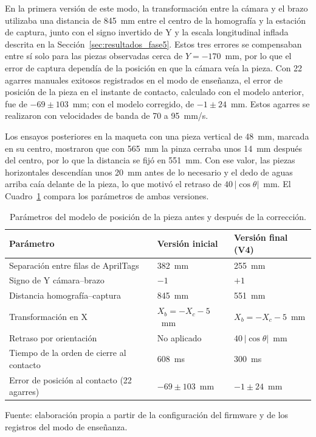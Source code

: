 En la primera versión de este modo, la transformación entre la cámara y el brazo utilizaba una distancia de 845~mm entre el centro de la homografía y la estación de captura, junto con el signo invertido de Y y la escala longitudinal inflada descrita en la Sección~\ref{sec:resultados_fase5}. Estos tres errores se compensaban entre sí solo para las piezas observadas cerca de $Y=-170$~mm, por lo que el error de captura dependía de la posición en que la cámara veía la pieza. Con 22 agarres manuales exitosos registrados en el modo de enseñanza, el error de posición de la pieza en el instante de contacto, calculado con el modelo anterior, fue de $-69\pm103$~mm; con el modelo corregido, de $-1\pm24$~mm. Estos agarres se realizaron con velocidades de banda de 70 a 95~mm/s.

Los ensayos posteriores en la maqueta con una pieza vertical de 48~mm, marcada en su centro, mostraron que con 565~mm la pinza cerraba unos 14~mm después del centro, por lo que la distancia se fijó en 551~mm. Con ese valor, las piezas horizontales descendían unos 20~mm antes de lo necesario y el dedo de aguas arriba caía delante de la pieza, lo que motivó el retraso de $40\,\lvert\cos\theta\rvert$~mm. El Cuadro~\ref{tab:fase5_modelo_posicion} compara los parámetros de ambas versiones.

\begin{table}[H]
    \centering
    \caption{Parámetros del modelo de posición de la pieza antes y después de la corrección.}
    \label{tab:fase5_modelo_posicion}
    \begin{tabular}{p{}p{}p{}}
        \hline
        Parámetro & Versión inicial & Versión final (V4) \\
        \hline
        Separación entre filas de AprilTags & 382~mm & 255~mm \\
        Signo de Y cámara--brazo & $-1$ & $+1$ \\
        Distancia homografía--captura & 845~mm & 551~mm \\
        Transformación en X & $X_b=-X_c-5$~mm & $X_b=-X_c-5$~mm \\
        Retraso por orientación & No aplicado & $40\,\lvert\cos\theta\rvert$~mm \\
        Tiempo de la orden de cierre al contacto & 608~ms & 300~ms \\
        Error de posición al contacto (22 agarres) & $-69\pm103$~mm & $-1\pm24$~mm \\
        \hline
    \end{tabular}
    \par\small\raggedright Fuente: elaboración propia a partir de la configuración del firmware y de los registros del modo de enseñanza.
\end{table}

